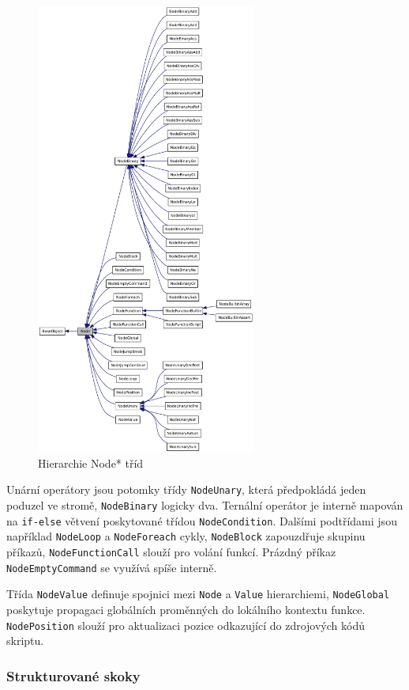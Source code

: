 \documentclass[11pt,twoside,a4paper]{book}
\begin{document}
\begin{figure}[ht]
\begin{center}
\includegraphics[height=14.9cm]{img/classNode__inherit__graph.pdf}
\caption{Hierarchie Node* tříd}
\label{fig:node_hierarchy}
\end{center}
\end{figure}

Unární operátory jsou potomky třídy \texttt{NodeUnary}, která předpokládá jeden poduzel ve stromě, \texttt{NodeBinary} logicky dva. Ternální operátor je interně mapován na \texttt{if-else} větvení poskytované třídou \texttt{NodeCondition}. Dalšími podtřídami jsou například \texttt{Node\-Loop} a \texttt{NodeForeach} cykly, \texttt{NodeBlock} zapouzdřuje skupinu příkazů, \texttt{Node\-Function\-Call} slouží pro volání funkcí. Prázdný příkaz \texttt{NodeEmptyCommand} se využívá spíše interně.

Třída \texttt{NodeValue} definuje spojnici mezi \texttt{Node} a \texttt{Value} hierarchiemi, \texttt{NodeGlobal} poskytuje propagaci globálních proměnných do lokálního kontextu funkce. \texttt{NodePosition} slouží pro aktualizaci pozice odkazující do zdrojových kódů skriptu.


\subsubsection{Strukturované skoky}
\label{strukturovane_skoky}
\end{document}
